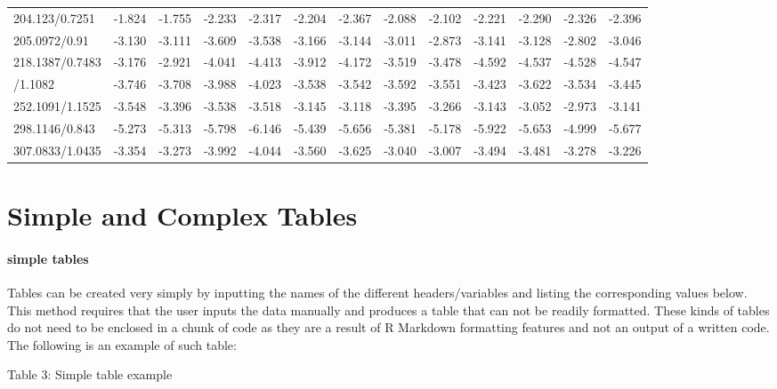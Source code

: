 \documentclass[]{elsarticle} %
\begin{document}
\begin{table}[H]
{\begin{tabular}[t]{lrrrrrrrrrrrr}
\rowcolor{gray!6}  204.123/0.7251 & -1.824 & -1.755 & -2.233 & -2.317 & -2.204 & -2.367 & -2.088 & -2.102 & -2.221 & -2.290 & -2.326 & -2.396\\
205.0972/0.91 & -3.130 & -3.111 & -3.609 & -3.538 & -3.166 & -3.144 & -3.011 & -2.873 & -3.141 & -3.128 & -2.802 & -3.046\\
\rowcolor{gray!6}  218.1387/0.7483 & -3.176 & -2.921 & -4.041 & -4.413 & -3.912 & -4.172 & -3.519 & -3.478 & -4.592 & -4.537 & -4.528 & -4.547\\
\addlinespace
238.0947/1.1082 & -3.746 & -3.708 & -3.988 & -4.023 & -3.538 & -3.542 & -3.592 & -3.551 & -3.423 & -3.622 & -3.534 & -3.445\\
\rowcolor{gray!6}  252.1091/1.1525 & -3.548 & -3.396 & -3.538 & -3.518 & -3.145 & -3.118 & -3.395 & -3.266 & -3.143 & -3.052 & -2.973 & -3.141\\
298.1146/0.843 & -5.273 & -5.313 & -5.798 & -6.146 & -5.439 & -5.656 & -5.381 & -5.178 & -5.922 & -5.653 & -4.999 & -5.677\\
\rowcolor{gray!6}  307.0833/1.0435 & -3.354 & -3.273 & -3.992 & -4.044 & -3.560 & -3.625 & -3.040 & -3.007 & -3.494 & -3.481 & -3.278 & -3.226\\
\bottomrule
\end{tabular}}
\end{table}

\hypertarget{simple-and-complex-tables}{%
\section{Simple and Complex Tables}\label{simple-and-complex-tables}}

\hypertarget{simple-tables}{%
\paragraph{simple tables}\label{simple-tables}}

Tables can be created very simply by inputting the names of the
different headers/variables and listing the corresponding values below.
This method requires that the user inputs the data manually and produces
a table that can not be readily formatted. These kinds of tables do not
need to be enclosed in a chunk of code as they are a result of R
Markdown formatting features and not an output of a written code. The
following is an example of such table:

\begin{center}
Table 3: Simple table example
\end{center}
\end{document}

